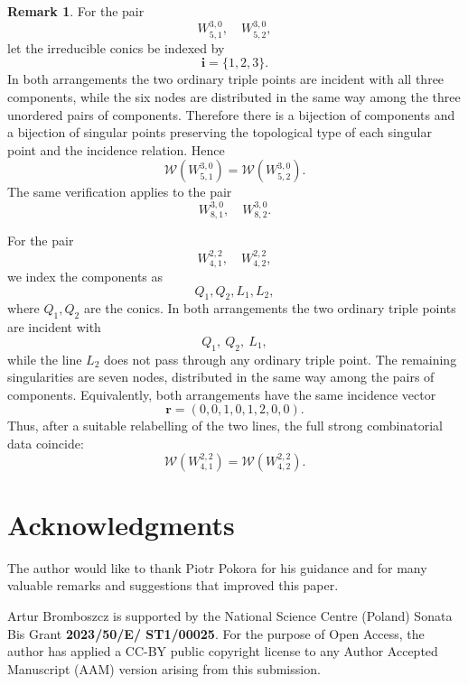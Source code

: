 \documentclass[11pt]{article}
\theoremstyle{plain}
\theoremstyle{definition}
\newtheorem{remark}[thm]{Remark}
\begin{document}
\begin{remark}
For the pair
\[
W^{3,0}_{5,1},\quad W^{3,0}_{5,2},
\]
let the irreducible conics be indexed by
\[
\mathbf{i}=\{1,2,3\}.
\]
In both arrangements the two ordinary triple points are incident with all three components, while the six nodes are distributed in the same way among the three unordered pairs of components. Therefore there is a bijection of components and a bijection of singular points preserving the topological type of each singular point and the incidence relation. Hence
\[
\mathcal{W}\left(W^{3,0}_{5,1}\right)=\mathcal{W}\left(W^{3,0}_{5,2}\right).
\]
The same verification applies to the pair
\[
W^{3,0}_{8,1},\quad W^{3,0}_{8,2}.\]

For the pair
\[
W^{2,2}_{4,1},\quad W^{2,2}_{4,2},
\]
we index the components as
\[
Q_1,Q_2,L_1,L_2,
\]
where \(Q_1,Q_2\) are the conics. In both arrangements the two ordinary triple points are incident with
\[
Q_1,\ Q_2,\ L_1,
\]
while the line \(L_2\) does not pass through any ordinary triple point. The remaining singularities are seven nodes, distributed in the same way among the pairs of components. Equivalently, both arrangements have the same incidence vector
\[
\mathbf{r}=(0,0,1,0,1,2,0,0).
\]
Thus, after a suitable relabelling of the two lines, the full strong combinatorial data coincide:
\[
\mathcal{W}\left(W^{2,2}_{4,1}\right)=\mathcal{W}\left(W^{2,2}_{4,2}\right).\]
\end{remark}


 \section*{Acknowledgments}
The author would like to thank Piotr Pokora for his guidance and for many valuable remarks and suggestions that improved this paper.

Artur Bromboszcz is supported by the National Science Centre (Poland) Sonata Bis Grant {\bf 2023/50/E/ ST1/00025}. For the purpose of Open Access, the author has applied a CC-BY public copyright license to any Author Accepted Manuscript (AAM) version arising from this submission.
\end{document}
